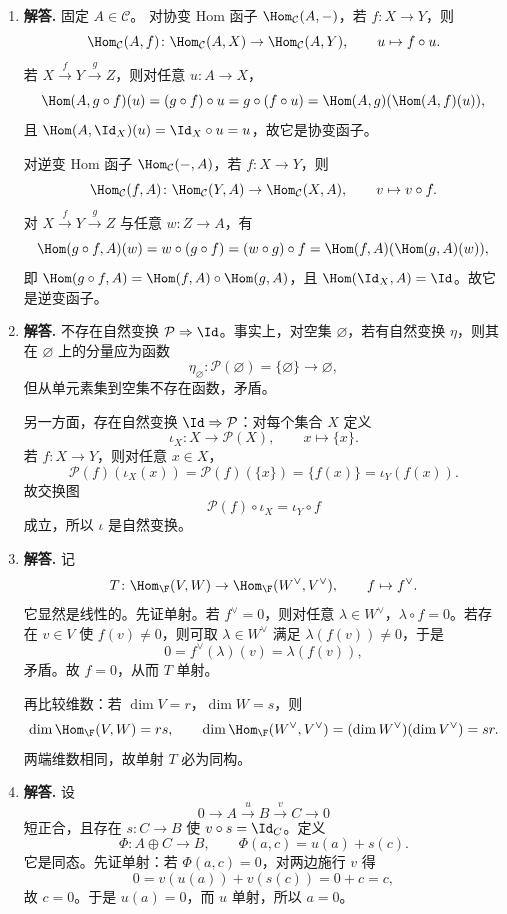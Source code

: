 \begin{enumerate}[label=\textbf{A.\arabic*.}, leftmargin=*, itemsep=1em]
  \item \textbf{解答.} 固定 $A\in \mathcal C$。
  对协变 Hom 函子 $\Hom_{\mathcal C}(A,-)$，若 $f\colon X\to Y$，则
  \[
    \Hom_{\mathcal C}(A,f)\colon \Hom_{\mathcal C}(A,X)\to \Hom_{\mathcal C}(A,Y),
    \qquad u\mapsto f\circ u.
  \]
  若 $X\xrightarrow{f}Y\xrightarrow{g}Z$，则对任意 $u\colon A\to X$，
  \[
    \Hom(A,g\circ f)(u)=(g\circ f)\circ u=g\circ (f\circ u)
    =\Hom(A,g)(\Hom(A,f)(u)),
  \]
  且 $\Hom(A,\Id_X)(u)=\Id_X\circ u=u$，故它是协变函子。

  对逆变 Hom 函子 $\Hom_{\mathcal C}(-,A)$，若 $f\colon X\to Y$，则
  \[
    \Hom_{\mathcal C}(f,A)\colon \Hom_{\mathcal C}(Y,A)\to \Hom_{\mathcal C}(X,A),
    \qquad v\mapsto v\circ f.
  \]
  对 $X\xrightarrow{f}Y\xrightarrow{g}Z$ 与任意 $w\colon Z\to A$，有
  \[
    \Hom(g\circ f,A)(w)=w\circ (g\circ f)=(w\circ g)\circ f
    =\Hom(f,A)(\Hom(g,A)(w)),
  \]
  即 $\Hom(g\circ f,A)=\Hom(f,A)\circ \Hom(g,A)$，且 $\Hom(\Id_X,A)=\Id$。故它是逆变函子。

  \item \textbf{解答.} 不存在自然变换 $\mathcal P\Rightarrow \Id$。事实上，对空集 $\varnothing$，若有自然变换 $\eta$，则其在 $\varnothing$ 上的分量应为函数
  \[
    \eta_{\varnothing}\colon \mathcal P(\varnothing)=\{\varnothing\}\to \varnothing,
  \]
  但从单元素集到空集不存在函数，矛盾。

  另一方面，存在自然变换 $\Id\Rightarrow \mathcal P$：对每个集合 $X$ 定义
  \[
    \iota_X\colon X\to \mathcal P(X),
    \qquad x\mapsto \{x\}.
  \]
  若 $f\colon X\to Y$，则对任意 $x\in X$，
  \[
    \mathcal P(f)(\iota_X(x))=\mathcal P(f)(\{x\})=\{f(x)\}=\iota_Y(f(x)).
  \]
  故交换图
  \[
    \mathcal P(f)\circ \iota_X=\iota_Y\circ f
  \]
  成立，所以 $\iota$ 是自然变换。

  \item \textbf{解答.} 记
  \[
    T\colon \Hom_{\F}(V,W)\to \Hom_{\F}(W^{\vee},V^{\vee}),
    \qquad f\mapsto f^{\vee}.
  \]
  它显然是线性的。先证单射。若 $f^{\vee}=0$，则对任意 $\lambda\in W^{\vee}$，$\lambda\circ f=0$。若存在 $v\in V$ 使 $f(v)\neq 0$，则可取 $\lambda\in W^{\vee}$ 满足 $\lambda(f(v))\neq 0$，于是
  \[
    0=f^{\vee}(\lambda)(v)=\lambda(f(v)),
  \]
  矛盾。故 $f=0$，从而 $T$ 单射。

  再比较维数：若 $\dim V=r$，$\dim W=s$，则
  \[
    \dim \Hom_{\F}(V,W)=rs,
    \qquad
    \dim \Hom_{\F}(W^{\vee},V^{\vee})=(\dim W^{\vee})(\dim V^{\vee})=sr.
  \]
  两端维数相同，故单射 $T$ 必为同构。

  \item \textbf{解答.} 设
  \[
    0\to A\xrightarrow{u}B\xrightarrow{v}C\to 0
  \]
  短正合，且存在 $s\colon C\to B$ 使 $v\circ s=\Id_C$。定义
  \[
    \Phi\colon A\oplus C\to B,
    \qquad \Phi(a,c)=u(a)+s(c).
  \]
  它是同态。先证单射：若 $\Phi(a,c)=0$，对两边施行 $v$ 得
  \[
    0=v(u(a))+v(s(c))=0+c=c,
  \]
  故 $c=0$。于是 $u(a)=0$，而 $u$ 单射，所以 $a=0$。


\end{enumerate}
